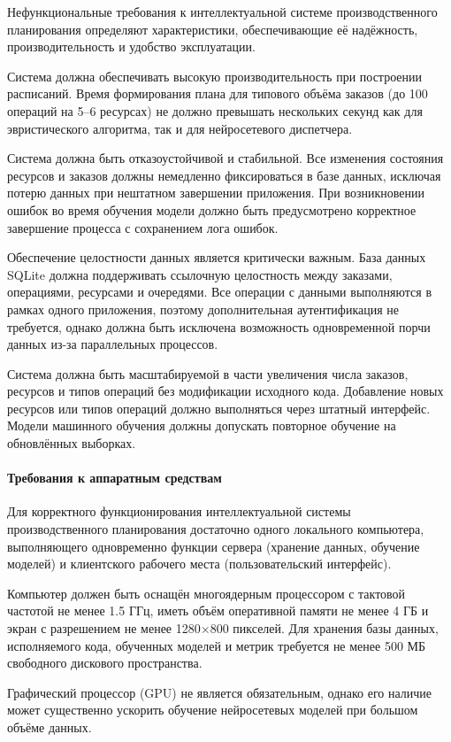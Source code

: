 Нефункциональные требования к интеллектуальной системе производственного планирования определяют характеристики, обеспечивающие её надёжность, производительность и удобство эксплуатации.

Система должна обеспечивать высокую производительность при построении расписаний. Время формирования плана для типового объёма заказов (до 100 операций на 5–6 ресурсах) не должно превышать нескольких секунд как для эвристического алгоритма, так и для нейросетевого диспетчера.

Система должна быть отказоустойчивой и стабильной. Все изменения состояния ресурсов и заказов должны немедленно фиксироваться в базе данных, исключая потерю данных при нештатном завершении приложения. При возникновении ошибок во время обучения модели должно быть предусмотрено корректное завершение процесса с сохранением лога ошибок.

Обеспечение целостности данных является критически важным. База данных SQLite должна поддерживать ссылочную целостность между заказами, операциями, ресурсами и очередями. Все операции с данными выполняются в рамках одного приложения, поэтому дополнительная аутентификация не требуется, однако должна быть исключена возможность одновременной порчи данных из-за параллельных процессов.

Система должна быть масштабируемой в части увеличения числа заказов, ресурсов и типов операций без модификации исходного кода. Добавление новых ресурсов или типов операций должно выполняться через штатный интерфейс. Модели машинного обучения должны допускать повторное обучение на обновлённых выборках.

\paragraph{Требования к аппаратным средствам}
Для корректного функционирования интеллектуальной системы производственного планирования достаточно одного локального компьютера, выполняющего одновременно функции сервера (хранение данных, обучение моделей) и клиентского рабочего места (пользовательский интерфейс).

Компьютер должен быть оснащён многоядерным процессором с тактовой частотой не менее 1.5 ГГц, иметь объём оперативной памяти не менее 4 ГБ и экран с разрешением не менее 1280×800 пикселей. Для хранения базы данных, исполняемого кода, обученных моделей и метрик требуется не менее 500 МБ свободного дискового пространства.

Графический процессор (GPU) не является обязательным, однако его наличие может существенно ускорить обучение нейросетевых моделей при большом объёме данных.

